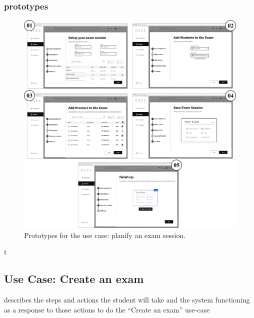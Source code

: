 \documentclass[]{uc2pfecaneva}
\begin{document}
    \subsubsection{prototypes}
    \begin{figure}[h]

        \centering
        \includegraphics[width=\textwidth]{images/prototypes_create_exam_session}

        \caption{Prototypes for the use case: planify an exam session.}
    \end{figure}
    \clearpage

t\subsection{Use Case: Create an exam}
    describes the steps and actions the student will take and the system functioning as a response
    to those actions to do the “Create an exam” use-case
\end{document}
